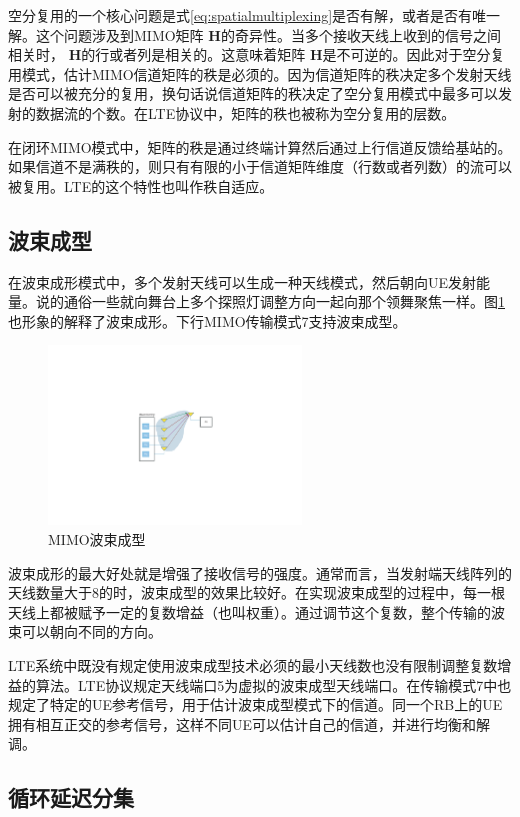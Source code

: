 \documentclass[10pt,a4paper,UTF8]{article}
\begin{document}
空分复用的一个核心问题是式\ref{eq:spatialmultiplexing}是否有解，或者是否有唯一解。这个问题涉及到MIMO矩阵 \(\mathbf{H}\)的奇异性。当多个接收天线上收到的信号之间相关时， \(\mathbf{H}\)的行或者列是相关的。这意味着矩阵 \(\mathbf{H}\)是不可逆的。因此对于空分复用模式，估计MIMO信道矩阵的秩是必须的。因为信道矩阵的秩决定多个发射天线是否可以被充分的复用，换句话说信道矩阵的秩决定了空分复用模式中最多可以发射的数据流的个数。在LTE协议中，矩阵的秩也被称为空分复用的层数。

在闭环MIMO模式中，矩阵的秩是通过终端计算然后通过上行信道反馈给基站的。如果信道不是满秩的，则只有有限的小于信道矩阵维度（行数或者列数）的流可以被复用。LTE的这个特性也叫作秩自适应。
\subsection{波束成型}
\label{sec:orgheadline30}


在波束成形模式中，多个发射天线可以生成一种天线模式，然后朝向UE发射能量。说的通俗一些就向舞台上多个探照灯调整方向一起向那个领舞聚焦一样。图\ref{fig:orgparagraph15}也形象的解释了波束成形。下行MIMO传输模式7支持波束成型。
\begin{figure}[htb]
\centering
\includegraphics[width=0.6\textwidth]{../../img/20151106beamforming.pdf}
\caption{\label{fig:orgparagraph15}
MIMO波束成型}
\end{figure}

波束成形的最大好处就是增强了接收信号的强度。通常而言，当发射端天线阵列的天线数量大于8的时，波束成型的效果比较好。在实现波束成型的过程中，每一根天线上都被赋予一定的复数增益（也叫权重）。通过调节这个复数，整个传输的波束可以朝向不同的方向。

LTE系统中既没有规定使用波束成型技术必须的最小天线数也没有限制调整复数增益的算法。LTE协议规定天线端口5为虚拟的波束成型天线端口。在传输模式7中也规定了特定的UE参考信号，用于估计波束成型模式下的信道。同一个RB上的UE拥有相互正交的参考信号，这样不同UE可以估计自己的信道，并进行均衡和解调。
\subsection{循环延迟分集}
\label{sec:orgheadline31}
\end{document}
